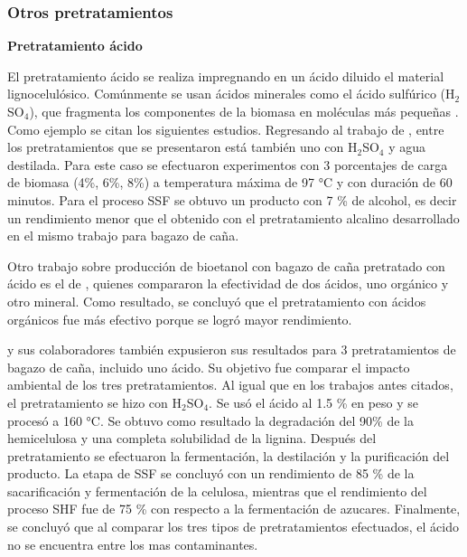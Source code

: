 \documentclass[12pt]{article}
\begin{document}








\subsubsection{Otros pretratamientos} 



\textbf{Pretratamiento ácido} 

El pretratamiento ácido se realiza impregnando en un ácido diluido el material lignocelulósico. Comúnmente se usan ácidos minerales como el ácido sulfúrico (H$_2$SO$_4$), que fragmenta los componentes de la biomasa en moléculas más pequeñas \cite{Galbe2012}. Como ejemplo se citan los siguientes estudios. %
Regresando al trabajo de \cite{Arturo2022evaluacion}, entre los pretratamientos que se presentaron está también uno con H$_2$SO$_4$ y agua destilada. Para este caso se efectuaron experimentos con 3 porcentajes de carga de biomasa (4\%, 6\%, 8\%) a temperatura máxima de 97 °C y con duración de 60 minutos. Para el proceso SSF se obtuvo un producto con 7 \% de alcohol, es decir un rendimiento menor que el obtenido con el pretratamiento alcalino desarrollado en el mismo trabajo para bagazo de caña.

Otro trabajo sobre producción de bioetanol con bagazo de caña  pretratado con ácido es el de \cite{TANTAYOTAI2022102499}, quienes compararon la efectividad de dos ácidos, uno orgánico y otro mineral. Como resultado, se concluyó que el pretratamiento con ácidos orgánicos fue más efectivo porque se logró mayor rendimiento.

\cite{rojas2010analisis} y sus colaboradores también expusieron sus resultados para 3 pretratamientos de bagazo de caña, incluido uno ácido. Su objetivo fue comparar el impacto ambiental de los tres pretratamientos. Al igual que en los trabajos antes citados, el pretratamiento se hizo con H$_2$SO$_4$. Se usó el ácido al 1.5 \% en peso y se procesó a 160 °C. Se obtuvo como resultado la degradación del 90\% de la hemicelulosa y una completa solubilidad de la lignina. Después del pretratamiento se efectuaron la fermentación, la destilación y la purificación del producto. La etapa de SSF se concluyó con un rendimiento de 85 \% de la sacarificación y fermentación de la celulosa, mientras que el rendimiento del proceso SHF fue de 75 \%  con respecto a la fermentación de azucares. Finalmente, se concluyó que al comparar los tres tipos de pretratamientos efectuados, el ácido no se encuentra entre los mas contaminantes.
\end{document}
